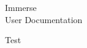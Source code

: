 \documentclass{memoir}
\begin{document}
\begin{flushright}
	\vspace*{2in}
	{\fontsize{50}{60}\selectfont Immerse}  \\
	\vspace{20pt}
	{\fontsize{30}{40}\selectfont User Documentation}
\end{flushright}

\newpage
\rfoot{\thepage}
Test
\end{document}
